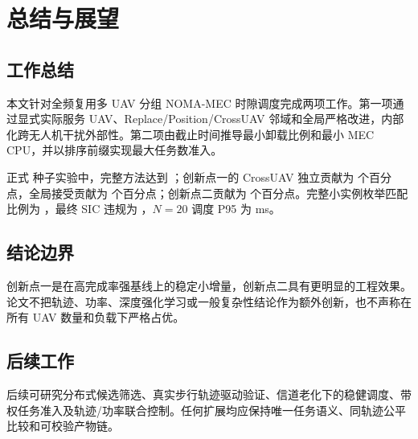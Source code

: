 \chapter{总结与展望}
\section{工作总结}
本文针对全频复用多 UAV 分组 NOMA-MEC 时隙调度完成两项工作。第一项通过显式实际服务 UAV、Replace/Position/CrossUAV 邻域和全局严格改进，内部化跨无人机干扰外部性。第二项由截止时间推导最小卸载比例和最小 MEC CPU，并以排序前缀实现最大任务数准入。

正式 \ConfirmatorySeedCount{} 种子实验中，完整方法达到 \FullOnTimePercent{}；创新点一的 CrossUAV 独立贡献为 \InnovationOneCrossGainPP{} 个百分点，全局接受贡献为 \InnovationOneAcceptanceGainPP{} 个百分点；创新点二贡献为 \InnovationTwoGainPP{} 个百分点。完整小实例枚举匹配比例为 \ExactOptimalPercent{}，最终 SIC 违规为 \SICViolationCount{}，$N=20$ 调度 P95 为 \FullRuntimePNinetyFiveMs{} ms。

\section{结论边界}
创新点一是在高完成率强基线上的稳定小增量，创新点二具有更明显的工程效果。论文不把轨迹、功率、深度强化学习或一般复杂性结论作为额外创新，也不声称在所有 UAV 数量和负载下严格占优。

\section{后续工作}
后续可研究分布式候选筛选、真实步行轨迹驱动验证、信道老化下的稳健调度、带权任务准入及轨迹/功率联合控制。任何扩展均应保持唯一任务语义、同轨迹公平比较和可校验产物链。
